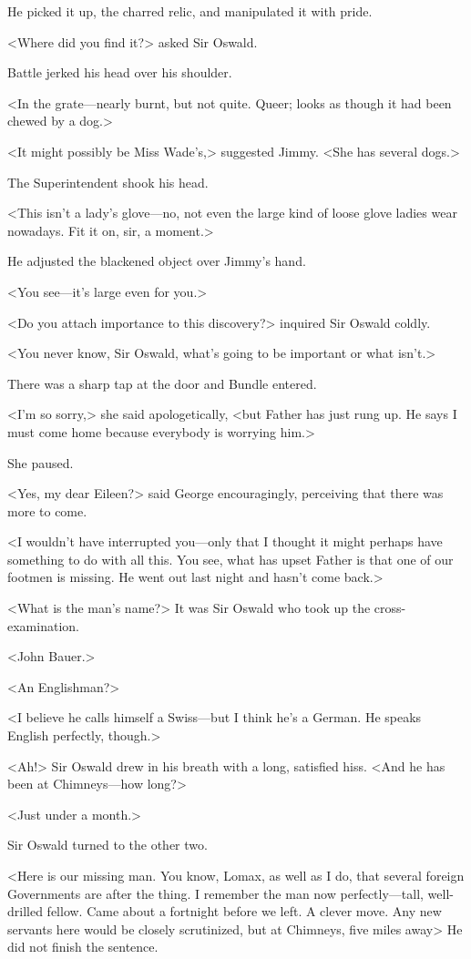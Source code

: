 He picked it up, the charred relic, and manipulated it with pride.

<Where did you find it?> asked Sir Oswald.

Battle jerked his head over his shoulder.

<In the grate—nearly burnt, but not quite. Queer; looks as though it had been chewed by a dog.>

<It might possibly be Miss Wade's,> suggested Jimmy. <She has several dogs.>

The Superintendent shook his head.

<This isn't a lady's glove—no, not even the large kind of loose glove ladies wear nowadays. Fit it on, sir, a moment.>

He adjusted the blackened object over Jimmy's hand.

<You see—it's large even for you.>

<Do you attach importance to this discovery?> inquired Sir Oswald coldly.

<You never know, Sir Oswald, what's going to be important or what isn't.>

There was a sharp tap at the door and Bundle entered.

<I'm so sorry,> she said apologetically, <but Father has just rung up. He says I must come home because everybody is worrying him.>

She paused.

<Yes, my dear Eileen?> said George encouragingly, perceiving that there was more to come.

<I wouldn't have interrupted you—only that I thought it might perhaps have something to do with all this. You see, what has upset Father is that one of our footmen is missing. He went out last night and hasn't come back.>

<What is the man's name?> It was Sir Oswald who took up the cross-examination.

<John Bauer.>

<An Englishman?>

<I believe he calls himself a Swiss—but I think he's a German. He speaks English perfectly, though.>

<Ah!> Sir Oswald drew in his breath with a long, satisfied hiss. <And he has been at Chimneys—how long?>

<Just under a month.>

Sir Oswald turned to the other two.

<Here is our missing man. You know, Lomax, as well as I do, that several foreign Governments are after the thing. I remember the man now perfectly—tall, well-drilled fellow. Came about a fortnight before we left. A clever move. Any new servants here would be closely scrutinized, but at Chimneys, five miles away\longdash> He did not finish the sentence.


